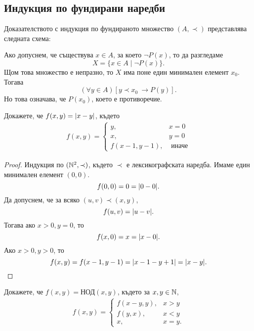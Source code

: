 \subsection*{Индукция по фундирани наредби}

Доказателството с индукция по фундираното множество $(A,\prec)$ представлява следната схема:
\begin{prooftree}
\end{prooftree}
Ако допуснем, че съществува $x \in A$, за което $\neg P(x)$, то да разгледаме
\[X = \{x\in A\mid \neg P(x)\}.\]
Щом това множество е непразно, то $X$ има поне един минимален елемент $x_0$.
Тогава
\[(\forall y\in A)[y \prec x_0\ \rightarrow P(y)].\]
Но това означава, че $P(x_0)$, което е противоречие.

\begin{problem}
  Докажете,  че $f(x,y) = \abs{x-y}$, където
  \begin{align*}
    f(x,y) = 
    \begin{cases}
      y, & x = 0\\
      x, & y = 0\\
      f(x-1,y-1), & \mbox{ иначе}
    \end{cases}
  \end{align*}
\end{problem}
\begin{proof}
  Индукция по $(\Nat^2,\prec)$, където $\prec$ е лексикографската наредба.
  Имаме един минимален елемент $(0,0)$.
  \[f(0,0) = 0 = \abs{0 - 0}.\]
  Да допуснем, че за всяко $(u,v) \prec (x,y)$, 
  \[f(u,v) = \abs{u - v}.\]
  Тогава ако $x > 0, y = 0$, то
  \[f(x,0) = x = \abs{x - 0}.\]
  Ако $x> 0, y > 0$, то
  \[f(x,y) = f(x-1,y-1) = \abs{x-1-y+1} =\abs{x-y}.\]
\end{proof}

\begin{problem}
  Докажете, че $f(x,y) = \mbox{НОД}(x,y)$, където
  за $x,y \in \Nat$,
  \begin{align*}
    f(x,y) = 
    \begin{cases}
      f(x-y,y), & x > y\\
      f(y,x), & x < y\\
      x, & x = y.
    \end{cases}
  \end{align*}
\end{problem}

